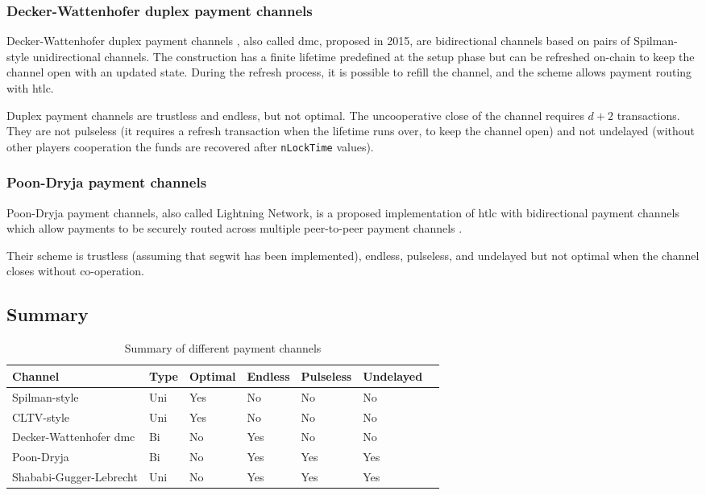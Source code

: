 \subsubsection{Decker-Wattenhofer duplex payment channels}

Decker-Wattenhofer duplex payment channels \cite{Decker2015fast}, also called
\gls{dmc}, proposed in 2015, are bidirectional channels based on pairs of
Spilman-style unidirectional channels. The construction has a finite lifetime
predefined at the setup phase but can be refreshed on-chain to keep the channel
open with an updated state. During the refresh process, it is possible to refill
the channel, and the scheme allows payment routing with \gls{htlc}.

Duplex payment channels are trustless and endless, but not optimal. The
uncooperative close of the channel requires $d + 2$ transactions. They are not
pulseless (it requires a refresh transaction when the lifetime runs over, to keep
the channel open) and not undelayed (without other players cooperation the funds are
recovered after \texttt{nLockTime} values).

\subsubsection{Poon-Dryja payment channels}

Poon-Dryja payment channels, also called Lightning Network, is a proposed
implementation of \gls{htlc} with bidirectional payment channels which allow
payments to be securely routed across multiple peer-to-peer payment channels
\cite{poon2016bitcoin}.

Their scheme is trustless (assuming that \gls{segwit} has been implemented),
endless, pulseless, and undelayed but not optimal when the channel closes
without co-operation.

\subsection{Summary}

\begin{table}[h]
  \begin{tabularx}{\textwidth}{ | X | l | l | l | l | l | l |}
  \hline
  Channel & Type & Optimal & Endless & Pulseless & Undelayed \\ \hline \hline
  Spilman-style & Uni & Yes & No & No & No \\ \hline
  CLTV-style & Uni & Yes & No & No & No \\ \hline
  Decker-Wattenhofer \gls{dmc} & Bi & No & Yes & No & No \\ \hline
  Poon-Dryja & Bi & No & Yes & Yes & Yes \\ \hline
  Shababi-Gugger-Lebrecht & Uni & No & Yes & Yes & Yes \\
  \hline
  \end{tabularx}
  \caption{Summary of different payment channels}
  \label{fig:summaryPaymentChannel}
\end{table}

